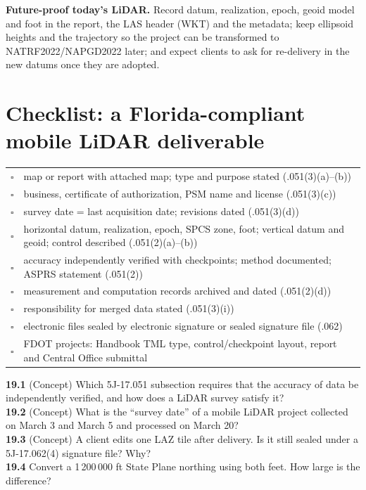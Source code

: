\begin{tip}
\textbf{Future-proof today's LiDAR.} Record datum, realization, epoch, geoid model and foot in the report, the LAS header (WKT) and the metadata; keep ellipsoid heights and the trajectory so the project can be transformed to NATRF2022/NAPGD2022 later; and expect clients to ask for re-delivery in the new datums once they are adopted.
\end{tip}

\section{Checklist: a Florida-compliant mobile LiDAR deliverable}
\begin{center}\small
\renewcommand{\arraystretch}{1.18}
\begin{tabularx}{\linewidth}{lX}\toprule
$\square$ & map or report with attached map; type and purpose stated (.051(3)(a)--(b))\\
$\square$ & business, certificate of authorization, PSM name and license (.051(3)(c))\\
$\square$ & survey date = last acquisition date; revisions dated (.051(3)(d))\\
$\square$ & horizontal datum, realization, epoch, SPCS zone, foot; vertical datum and geoid; control described (.051(2)(a)--(b))\\
$\square$ & accuracy independently verified with checkpoints; method documented; ASPRS statement (.051(2))\\
$\square$ & measurement and computation records archived and dated (.051(2)(d))\\
$\square$ & responsibility for merged data stated (.051(3)(i))\\
$\square$ & electronic files sealed by electronic signature or sealed signature file (.062)\\
$\square$ & FDOT projects: Handbook TML type, control/checkpoint layout, report and Central Office submittal\\\bottomrule
\end{tabularx}\end{center}

\begin{tryit}
\textbf{19.1} (Concept) Which 5J-17.051 subsection requires that the accuracy of data be independently verified, and how does a LiDAR survey satisfy it?\\
\textbf{19.2} (Concept) What is the ``survey date'' of a mobile LiDAR project collected on March 3 and March 5 and processed on March 20?\\
\textbf{19.3} (Concept) A client edits one LAZ tile after delivery. Is it still sealed under a 5J-17.062(4) signature file? Why?\\
\textbf{19.4} Convert a 1\,200\,000 ft State Plane northing using both feet. How large is the difference?
\end{tryit}

